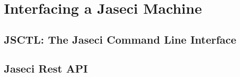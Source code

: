 \chapter{Interfacing a Jaseci Machine}
\section{JSCTL: The Jaseci Command Line Interface}
\section{Jaseci Rest API}